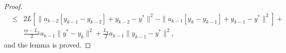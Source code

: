 \documentclass[10pt,a4paper]{amsart}
\begin{document}
\begin{proof}
\begin{eqnarray*}
& \leq &   2 L [\|a_{k-2}[ y_{k-1} - y_{k-2}]  + y_{k-2} - y^\ast \|^2 - \| a_{k-1}[ y_{k} - y_{k-1}]  + y_{k-1} - y^\ast \|^2] + \\
&   & \frac{\underline{m} - L_k}{2}a_{k-1} \| y^\ast - y_{k} \|^2 + \frac{L_k}{2}a_{k-1} \| y_{k-1} - y^\ast \|^2, 
\end{eqnarray*}
and the lemma is proved.

\end{proof}
\end{document}
